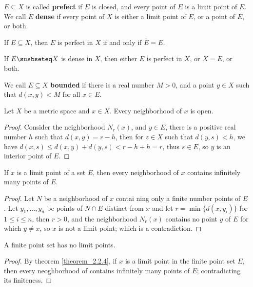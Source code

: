 \begin{definition}
  $E \subseteq X$ is called \textbf{prefect} if  $E$ is closed, and every point
  of $E$ is a limit point of $E$. We call $E$ \textbf{dense} if  every point of
  $X$ is either a limit point of $E$, or a point of  $E$, or both.
\end{definition}

\begin{lemma}\label{lemma_2.2.2}
  If $E \subseteq X$, then  $E$ is perfect in  $X$ if and only if  $\bar{E}=E$.
\end{lemma}

\begin{lemma}\label{lemma_2.2.3}
  If $E \susbseteq X$ is dense in  $X$, then either  $E$ is perfect in $X$, or
  $X=E$, or both.
\end{lemma}

\begin{definition}
  We call  $E \subseteq X$ \textbf{bounded} if there is a real number  $M>0$, and
  a point $y \in X$ such that $d(x,y)<M$ for all $x \in E$.
\end{definition}

\begin{theorem}\label{theorem_2.2.3}
  Let $X$ be a metric space and  $x \in X$. Every neighborhood of  $x$ is open.
\end{theorem}
\begin{proof}
  Consider the neighborhood $N_r(x)$, and  $y \in E$, there is a positive real
  number $h$ such that $d(x,y)=r-h$, then for $z \in X$ such that $d(y,s)<h$, we
  have $d(x,s) \leq d(x,y)+d(y,s)<r-h+h=r$, thus $s \in E$, so $y$ is an interior
  point of $E$.
\end{proof}

\begin{theorem}\label{theorem_2.2.4}
  If $x$ is a limit point of a set  $E$, then every neighborhood of  $x$ contains
  infinitely many points of  $E$.
\end{theorem}
\begin{proof}
  Let $N$ be a neighborhood of  $x$ contai ning only a finite number points of
  $E$. Let $y_1, \dots, y_n$ be points of $N \cap E$ distinct from  $x$ and let
  $r=\min\{d(x,y_i)\}$ for  $1 \leq i \leq n$, then  $r>0$, and the neighborhood
  $N_r(x)$ contains no point $y$ of $E$ for which $y \neq x$, so $x$ is not a
  limit point; which is a contradiction.
\end{proof}

\begin{corollary}
  A finite point set has no limit points.
\end{corollary}
\begin{proof}
  By theorem \ref{theorem_2.2.4}, if $x$ is a limit point in the finite point set
  $E$, then every neoghborhood of contains infinitely many points of $E$;
  contradicting its finiteness.
\end{proof}

